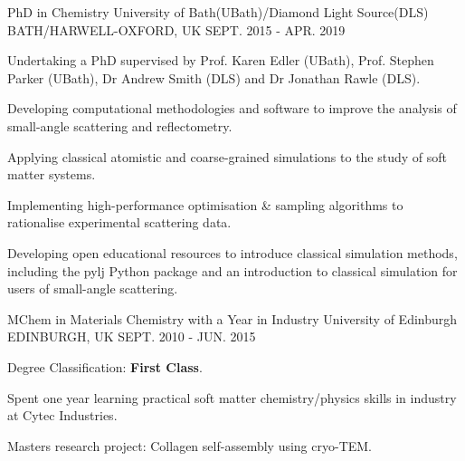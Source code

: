 \begin{cventries}
  \cventry
    {PhD in Chemistry}
    {University of Bath(UBath)/Diamond Light Source(DLS)}
    {BATH/HARWELL-OXFORD, UK}
    {SEPT. 2015 - APR. 2019}
    {
      \begin{cvitems}
        \item {Undertaking a PhD supervised by Prof. Karen Edler (UBath), Prof. Stephen Parker (UBath), Dr Andrew Smith (DLS) and Dr Jonathan Rawle (DLS).}
        \item {Developing computational methodologies and software to improve the analysis of small-angle scattering and reflectometry.}
        \item {Applying classical atomistic and coarse-grained simulations to the study of soft matter systems.}
        \item {Implementing high-performance optimisation \& sampling algorithms to rationalise experimental scattering data.}
        \item {Developing open educational resources to introduce classical simulation methods, including the pylj Python package and an introduction to classical simulation for users of small-angle scattering.}
      \end{cvitems}
    }
  \cventry
    {MChem in Materials Chemistry with a Year in Industry}
    {University of Edinburgh}
    {EDINBURGH, UK}
    {SEPT. 2010 - JUN. 2015}
    {
      \begin{cvitems}
        \item {Degree Classification: \textbf{First Class}.}
        \item {Spent one year learning practical soft matter chemistry/physics skills in industry at Cytec Industries.}
        \item {Masters research project: Collagen self-assembly using cryo-TEM.}
      \end{cvitems}
    }
\end{cventries}
